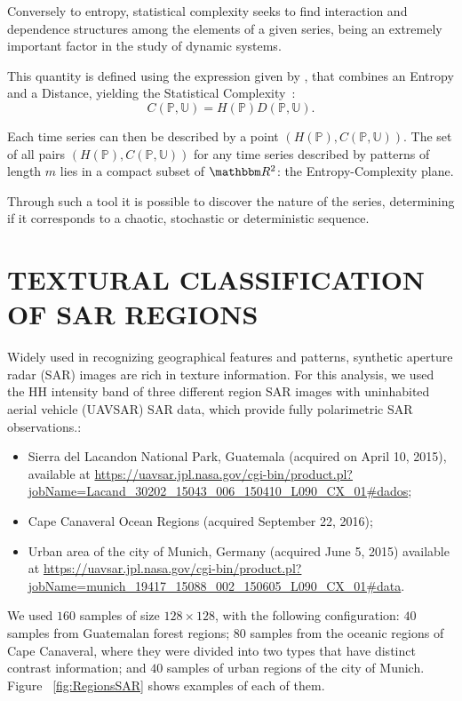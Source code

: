 \documentclass{isprs}
\begin{document}
	Conversely to entropy, statistical complexity seeks to find interaction and dependence structures among the elements of a given series, being an extremely important factor in the study of dynamic systems.
	
	This quantity is defined using the expression given by \citet{Lopez1995statistical}, 
	that combines an Entropy and a Distance, yielding the Statistical Complexity~\citep{Feldman2008information,Feldman1998Statistical}:
	\begin{equation}
	C(\mathbb{P}, \mathbb{U}) = H(\mathbb{P}) D(\mathbb{P}, \mathbb{U}).
	\end{equation}
	
	Each time series can then be described by a point $(H(\mathbb{P}), C(\mathbb{P}, \mathbb{U}))$.
	The set of all pairs $(H(\mathbb{P}), C(\mathbb{P}, \mathbb{U}))$ for any time series described by patterns of length $m$ lies in a compact subset of $\mathbbm R^2$: the Entropy-Complexity plane. 
	
	Through such a tool it is possible to discover the nature of the series, determining if it corresponds to a chaotic, stochastic or deterministic sequence.
	
	\section{TEXTURAL CLASSIFICATION OF SAR REGIONS}\label{SAR}
	
	Widely used in recognizing geographical features and patterns, synthetic aperture radar (SAR) images are rich in texture information.
	For this analysis, we used the HH intensity band of three different region SAR images with uninhabited aerial vehicle (UAVSAR) SAR data, which provide fully polarimetric SAR observations.:
	\begin{itemize}
		\item Sierra del Lacandon National Park, Guatemala (acquired on April 10, 2015), available at \url{https://uavsar.jpl.nasa.gov/cgi-bin/product.pl?jobName=Lacand_30202_15043_006_150410_L090_CX_01#dados};
		\item Cape Canaveral Ocean Regions (acquired September 22, 2016);
		\item Urban area of the city of Munich, Germany (acquired June 5, 2015) available at \url{https://uavsar.jpl.nasa.gov/cgi-bin/product.pl?jobName=munich_19417_15088_002_150605_L090_CX_01#data}.
	\end{itemize}
	
	We used $160$ samples of size $128\times128$, with the following configuration:
	$40$ samples from Guatemalan forest regions;
	$80$ samples from the oceanic regions of Cape Canaveral, where they were divided into two types that have distinct contrast information; and
	$40$ samples of urban regions of the city of Munich.
	Figure ~\ref{fig:RegionsSAR} shows examples of each of them.
	
\end{document}
